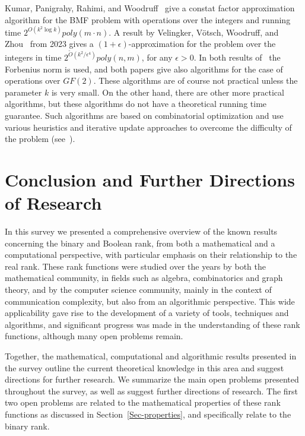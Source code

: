 \documentclass[11pt]{article}
\begin{document}
{{Kumar, Panigrahy, Rahimi, and Woodruff~\cite{kumar2019faster} give  a constat factor approximation algorithm for the BMF problem with operations
over the integers and running time  $2^{O(k^2\log k)}poly(m \cdot n)$.
A  result by Velingker,  V\"{o}tsch, Woodruff, and  Zhou~\cite{velingker2023fast} from 2023 gives a $(1 + \epsilon)$-approximation for the problem over the integers
in time $2^{\tilde{O}(k^2/\epsilon^4)}poly(n,m)$, for any $\epsilon > 0$.
In both results of~\cite{kumar2019faster,velingker2023fast}  the Forbenius norm is used, and both papers give also algorithms for the case of operations over $GF(2)$.
These algorithms are of course not practical unless the parameter $k$ is very small.
On the other hand, there are other more practical algorithms, but these algorithms do not have a theoretical running time guarantee.
Such algorithms are based on combinatorial optimization and use various heuristics and iterative update approaches to overcome the difficulty of the problem
(see~\cite{miettinen2021recent}).



\section{Conclusion and Further Directions of Research}
\label{sec-discussion}

In this survey we presented a comprehensive overview of the known results concerning the binary and Boolean rank, from both a mathematical and a computational perspective,
with particular emphasis on their relationship to the real rank.
These rank functions were studied over the years by both the mathematical community, in fields such as algebra, combinatorics and graph theory,
and by the computer science community, mainly in the context of communication complexity, but also from an algorithmic perspective.
This wide applicability gave rise to the development of a variety of tools, techniques and algorithms,
and  significant progress was made in the understanding of these rank functions, although many open problems remain.

Together, the mathematical, computational and algorithmic results presented in the survey outline the current theoretical knowledge in this area and suggest directions for further research.
We summarize the main open problems presented throughout the survey, as well as suggest further directions of research.
The first two open problems are related to the mathematical properties of these rank functions as discussed in Section~\ref{Sec-properties},
and specifically relate to the binary rank.

}}
\end{document}

